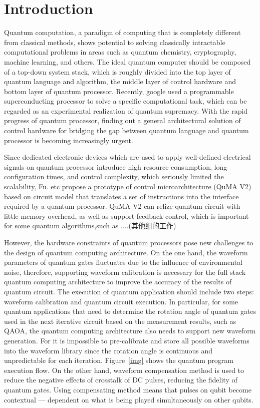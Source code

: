 \section{Introduction}
Quantum computation, a paradigm of computing that is completely different from 
classical methods, shows potential to solving classically intractable computational 
problems in areas such as quantum chemistry, cryptography, machine learning, 
and others. The ideal quantum computer should be composed of a top-down system stack, 
which is roughly divided into the top layer of quantum language and algorithm, 
the middle layer of control hardware and bottom layer of quantum processor. 
Recently, google used a programmable superconducting processor to solve a 
specific computational task, which can be regarded as an experimental 
realization of quantum supremacy. With the rapid progress of quantum processor, 
finding out a general architectural solution of control hardware for bridging 
the gap between quantum language and quantum processor is becoming increasingly urgent.

Since dedicated electronic devices which are used to apply well-defined electrical signals 
on quantum processor introduce high resource consumption, long configuration times, 
and control complexity, which seriously limited the scalability, Fu. etc propose a prototype of 
control microarchitecture (QuMA V2) based on circuit model that translates a set of instructions into the 
interface required by a quantum processor. QuMA V2 can relize quantum circuit with little memory overhead, 
as well as support feedback control, which is important for some quantum algorithms,such as ....(其他组的工作)

However, the hardware constraints of quantum processors pose new challenges to the design of 
quantum computing architecture. On the one hand, the waveform parameters of quantum gates fluctuates due to the 
influence of environmental noise, therefore, supporting waveform calibration is necessary for the full stack 
quantum computing architecture to improve the accuracy of the results of quantum circuit. The execution of quantum 
application should include two steps:  waveform calibration and quantum circuit execution. 
In particular, for some quantum applications that need to determine the rotation angle of quantum gates 
used in the next iterative circuit based on the measurement results, such as QAOA, the quantum computing 
architecture also needs to support new waveform generation. For it is impossible to pre-calibrate and store 
all possible waveforms into the waveform library since the rotation angle is continuous and unpredictable 
for each iteration. Figure~\ref{img} shows the quantum program execution flow. On the other hand, waveform compensation 
method is used to reduce the negative effects of crosstalk of DC pulses, reducing the fidelity of quantum gates. 
Using compensating method means that pulses on qubit become contextual --- dependent on what is being played 
simultaneously on other qubits. 

